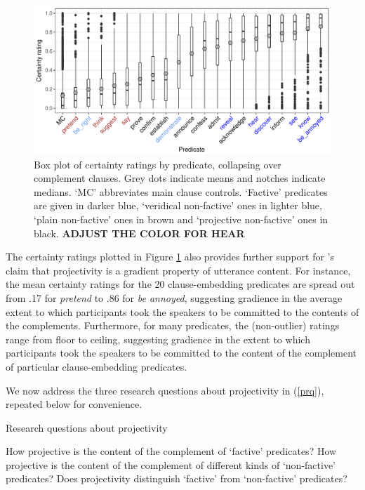\documentclass[11pt,fleqn]{article}
\newcommand{\6}{\mbox{$[\hspace*{-.6mm}[$}}
\newcommand{\9}{\mbox{$]\hspace*{-.6mm}]$}}
\newcommand{\citepos}[1]{\citeauthor{#1}'s \citeyear{#1}}
\begin{document}
\begin{figure}[H]
\centering

\includegraphics[width=.75\paperwidth]{../results/5-projectivity-no-fact/graphs/boxplot-projectivity}

\caption{Box plot of certainty ratings by predicate, collapsing over complement clauses. Grey dots indicate means and notches indicate medians. `MC' abbreviates main clause controls. `Factive' predicates are given in darker blue, `veridical non-factive' ones in lighter blue, `plain non-factive' ones in brown and `projective non-factive' ones in black. {\bf ADJUST THE COLOR FOR HEAR}}
\label{f-projectivity}
\end{figure}

The certainty ratings plotted in Figure \ref{f-projectivity} also provides further support for \citepos{tbd-variability} claim that projectivity is a gradient property of utterance content. For instance, the mean certainty ratings for the 20 clause-embedding predicates are spread out from .17 for {\em pretend} to .86 for {\em be annoyed}, suggesting gradience in the average extent to which participants took the speakers to be committed to the contents of the complements. Furthermore, for many predicates, the (non-outlier) ratings range from floor to ceiling, suggesting gradience in the extent to which participants took the speakers to be committed to the content of the complement of particular clause-embedding predicates. 

We now address the three research questions about projectivity in (\ref{prq}), repeated below for convenience. 

\begin{exe}
\exi{(\ref{prq})} Research questions about projectivity
\begin{xlist}
\ex How projective is the content of the complement of `factive' predicates?
\ex How projective is the content of the complement of different kinds of `non-factive' predicates?
\ex Does projectivity distinguish `factive' from `non-factive' predicates?
\end{xlist}
\end{exe}
\end{document}
